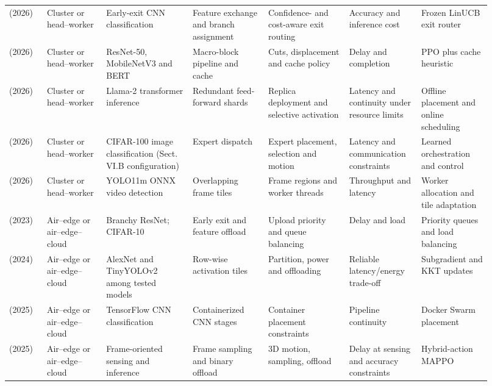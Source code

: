 \begin{longtable}{@{}Y{0.075\linewidth}Y{0.111\linewidth}Y{0.169\linewidth}Y{0.145\linewidth}Y{0.151\linewidth}Y{0.125\linewidth}Y{0.139\linewidth}@{}}
\cite{R0075}\newline\mbox{(2026)} & Cluster or head--worker & Early-exit CNN classification & Feature exchange and branch assignment & Confidence- and cost-aware exit routing & Accuracy and inference cost & Frozen LinUCB exit router \\
\cite{R0095}\newline\mbox{(2026)} & Cluster or head--worker & ResNet-50, MobileNetV3 and BERT & Macro-block pipeline and cache & Cuts, displacement and cache policy & Delay and completion & PPO plus cache heuristic \\
\cite{R0110}\newline\mbox{(2026)} & Cluster or head--worker & Llama-2 transformer inference & Redundant feed-forward shards & Replica deployment and selective activation & Latency and continuity under resource limits & Offline placement and online scheduling \\
\cite{R0118}\newline\mbox{(2026)} & Cluster or head--worker & CIFAR-100 image classification (Sect. VI.B configuration) & Expert dispatch & Expert placement, selection and motion & Latency and communication constraints & Learned orchestration and control \\
\cite{R0125}\newline\mbox{(2026)} & Cluster or head--worker & YOLO11m ONNX video detection & Overlapping frame tiles & Frame regions and worker threads & Throughput and latency & Worker allocation and tile adaptation \\
\cite{R0089}\newline\mbox{(2023)} & Air--edge or air--edge--cloud & Branchy ResNet; CIFAR-10 & Early exit and feature offload & Upload priority and queue balancing & Delay and load & Priority queues and load balancing \\
\cite{R0044}\newline\mbox{(2024)} & Air--edge or air--edge--cloud & AlexNet and TinyYOLOv2 among tested models & Row-wise activation tiles & Partition, power and offloading & Reliable latency\allowbreak{}/energy trade-off & Subgradient and KKT updates \\
\cite{R0038}\newline\mbox{(2025)} & Air--edge or air--edge--cloud & TensorFlow CNN classification & Containerized CNN stages & Container placement constraints & Pipeline continuity & Docker Swarm placement \\
\cite{R0064}\newline\mbox{(2025)} & Air--edge or air--edge--cloud & Frame-oriented sensing and inference & Frame sampling and binary offload & 3D motion, sampling, offload & Delay at sensing and accuracy constraints & Hybrid-action MAPPO \\

\end{longtable}
